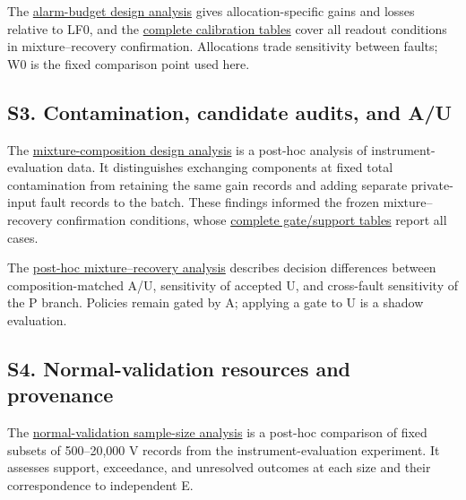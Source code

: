 \documentclass[10pt,a4paper]{article}
\begin{document}
The \href{https://github.com/metaSATOKEN/First-Order-Probes/blob/789f3c83bc85511d9e7a65f083c5806f2d36e8f2/numerics/analysis/pr0006_6f23fc7946f8_performance_v2/PR0006_BUDGET_REPORT_JA.md}{alarm-budget design analysis} gives allocation-specific gains and losses relative to LF0, and the \href{https://github.com/metaSATOKEN/First-Order-Probes/blob/789f3c83bc85511d9e7a65f083c5806f2d36e8f2/numerics/analysis/pr0012_64bf0f2c7697_confirmation_v1/ALL_CALIBRATIONS.md}{complete calibration tables} cover all readout conditions in mixture–recovery confirmation. Allocations trade sensitivity between faults; W0 is the fixed comparison point used here.

\subsection{S3. Contamination, candidate audits, and A/U}

The \href{https://github.com/metaSATOKEN/First-Order-Probes/blob/789f3c83bc85511d9e7a65f083c5806f2d36e8f2/numerics/analysis/pr0010_9adfa7a8c6e0_mixture_v1/PR0010_MIXTURE_REPORT_JA.md}{mixture-composition design analysis} is a post-hoc analysis of instrument-evaluation data. It distinguishes exchanging components at fixed total contamination from retaining the same gain records and adding separate private-input fault records to the batch. These findings informed the frozen mixture–recovery confirmation conditions, whose \href{https://github.com/metaSATOKEN/First-Order-Probes/blob/789f3c83bc85511d9e7a65f083c5806f2d36e8f2/numerics/analysis/pr0012_64bf0f2c7697_confirmation_v1/ALL_GATES_AND_SUPPORT.md}{complete gate/support tables} report all cases.

The \href{https://github.com/metaSATOKEN/First-Order-Probes/blob/789f3c83bc85511d9e7a65f083c5806f2d36e8f2/numerics/analysis/pr0012_64bf0f2c7697_exploration_v2/PR0012_EXPLORATORY_INSIGHTS_JA.md}{post-hoc mixture–recovery analysis} describes decision differences between composition-matched A/U, sensitivity of accepted U, and cross-fault sensitivity of the P branch. Policies remain gated by A; applying a gate to U is a shadow evaluation.

\subsection{S4. Normal-validation resources and provenance}

The \href{https://github.com/metaSATOKEN/First-Order-Probes/blob/789f3c83bc85511d9e7a65f083c5806f2d36e8f2/numerics/analysis/pr0009_9adfa7a8c6e0_v_budget_v1/PR0009_V_BUDGET_REPORT_JA.md}{normal-validation sample-size analysis} is a post-hoc comparison of fixed subsets of 500–20,000 V records from the instrument-evaluation experiment. It assesses support, exceedance, and unresolved outcomes at each size and their correspondence to independent E.
\end{document}
